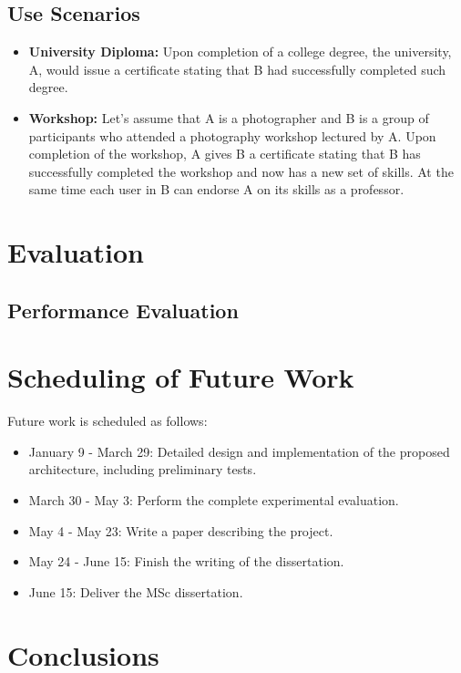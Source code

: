 \documentclass[llncsdoc]{llncs}
\begin{document}
\subsection{Use Scenarios}
\begin{itemize}
\item \textbf{University Diploma:} Upon completion of a college degree, the university, A, would issue a certificate stating that B had successfully completed such degree.
\item \textbf{Workshop:} Let's assume that A is a photographer and B is a group of participants who attended a photography workshop lectured by A. Upon completion of the workshop, A gives B a certificate stating that B has successfully completed the workshop and now has a new set of skills. At the same time each user in B can endorse A on its skills as a professor.
\end{itemize}






\section{Evaluation}
\label{sec:evaluation}


\subsection{Performance Evaluation}

\section{Scheduling of Future Work}
\label{sec:fwork}

Future work is scheduled as follows:

\begin{itemize}
\item January 9 - March 29: Detailed design and implementation of the
 proposed architecture, including preliminary tests.
\item March 30 - May 3: Perform the complete experimental evaluation.
\item May 4 - May 23: Write a paper describing the project.
\item May 24 - June 15: Finish the writing of the dissertation.
\item June 15: Deliver the MSc dissertation.
\end{itemize}

\section{Conclusions}
\label{sec:conclusions}






\end{document}
